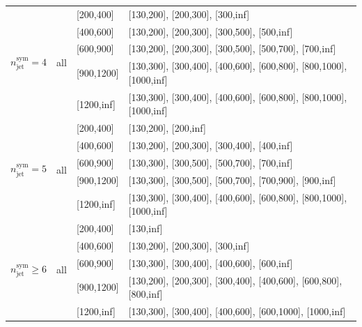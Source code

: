 \begin{table}[h!]
\begin{tabular}{ ccll }
    \hline
    \multirow{5}{*}{$n^{\mathrm{sym}}_{\mathrm{jet}} = 4$} & \multirow{5}{*}{all} & [200,400] & [130,200], [200,300], [300,inf] \\
    & & [400,600] & [130,200], [200,300], [300,500], [500,inf] \\
    & & [600,900] & [130,200], [200,300], [300,500], [500,700], [700,inf] \\
    & & [900,1200] & [130,300], [300,400], [400,600], [600,800], [800,1000], [1000,inf] \\
    & & [1200,inf] & [130,300], [300,400], [400,600], [600,800], [800,1000], [1000,inf] \\
    \hline
    \multirow{5}{*}{$n^{\mathrm{sym}}_{\mathrm{jet}} = 5$} & \multirow{5}{*}{all} & [200,400] & [130,200], [200,inf] \\
    & & [400,600] & [130,200], [200,300], [300,400], [400,inf] \\
    & & [600,900] & [130,300], [300,500], [500,700], [700,inf] \\
    & & [900,1200] & [130,300], [300,500], [500,700], [700,900], [900,inf] \\
    & & [1200,inf] & [130,300], [300,400], [400,600], [600,800], [800,1000], [1000,inf] \\
    \hline
    \multirow{5}{*}{$n^{\mathrm{sym}}_{\mathrm{jet}} \geq 6$} & \multirow{5}{*}{all} & [200,400] & [130,inf] \\
    & & [400,600] & [130,200], [200,300], [300,inf] \\
    & & [600,900] & [130,300], [300,400], [400,600], [600,inf] \\
    & & [900,1200] & [130,200], [200,300], [300,400], [400,600], [600,800], [800,inf] \\
    & & [1200,inf] & [130,300], [300,400], [400,600], [600,1000], [1000,inf] \\
    \hline
    \hline
  \end{tabular}
\end{table}
